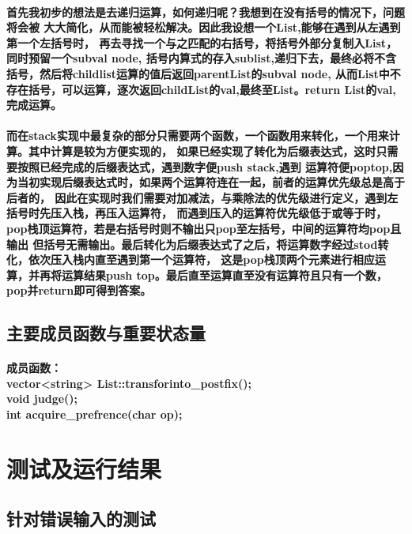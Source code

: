 \documentclass[UTF8]{ctexart}
\begin{document}
\paragraph{\hspace{2em}
首先我初步的想法是去递归运算，如何递归呢？我想到在没有括号的情况下，问题将会被
大大简化，从而能被轻松解决。因此我设想一个List,能够在遇到从左遇到第一个左括号时，
再去寻找一个与之匹配的右括号，将括号外部分复制入List，同时预留一个subval node,
括号内算式的存入sublist,递归下去，最终必将不含括号，然后将childlist运算的值后返回parentList的subval node,
从而List中不存在括号，可以运算，逐次返回childList的val,最终至List。return List的val,完成运算。}
\paragraph{
\hspace{2em}而在stack实现中最复杂的部分只需要两个函数，一个函数用来转化，一个用来计算。其中计算是较为方便实现的，
如果已经实现了转化为后缀表达式，这时只需要按照已经完成的后缀表达式，遇到数字便push stack,遇到
运算符便poptop,因为当初实现后缀表达式时，如果两个运算符连在一起，前者的运算优先级总是高于后者的，
因此在实现时我们需要对加减法，与乘除法的优先级进行定义，遇到左括号时先压入栈，再压入运算符，
而遇到压入的运算符优先级低于或等于时，pop栈顶运算符，若是右括号时则不输出只pop至左括号，中间的运算符均pop且输出
但括号无需输出。最后转化为后缀表达式了之后，将运算数字经过stod转化，依次压入栈内直至遇到第一个运算符，
这是pop栈顶两个元素进行相应运算，并再将运算结果push top。最后直至运算直至没有运算符且只有一个数，
pop并return即可得到答案。
}
\subsection{主要成员函数与重要状态量}
\paragraph{
    \hspace{2em}成员函数：\\
    vector<string> List::transforinto\_postfix();\\
    void judge();\\
    int acquire\_prefrence(char op);
}
\section{测试及运行结果}
\subsection{针对错误输入的测试}
\end{document}
